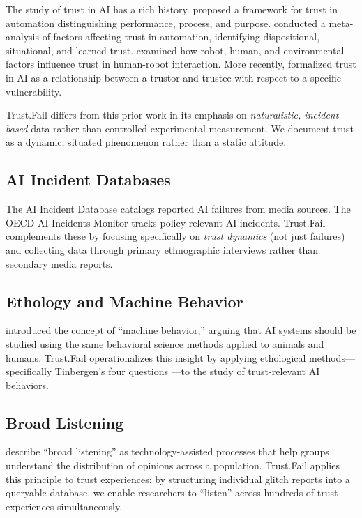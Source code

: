 \documentclass[11pt,a4paper]{article}
\begin{document}
The study of trust in AI has a rich history. \citet{lee2004trust} proposed a framework for trust in automation distinguishing performance, process, and purpose. \citet{hoff2015trust} conducted a meta-analysis of factors affecting trust in automation, identifying dispositional, situational, and learned trust. \citet{hancock2011meta} examined how robot, human, and environmental factors influence trust in human-robot interaction. More recently, \citet{jacovi2021formalizing} formalized trust in AI as a relationship between a trustor and trustee with respect to a specific vulnerability.

Trust.Fail differs from this prior work in its emphasis on \textit{naturalistic, incident-based} data rather than controlled experimental measurement. We document trust as a dynamic, situated phenomenon rather than a static attitude.

\subsection{AI Incident Databases}

The AI Incident Database \citep{mcgregor2021preventing} catalogs reported AI failures from media sources. The OECD AI Incidents Monitor tracks policy-relevant AI incidents. Trust.Fail complements these by focusing specifically on \textit{trust dynamics} (not just failures) and collecting data through primary ethnographic interviews rather than secondary media reports.

\subsection{Ethology and Machine Behavior}

\citet{rahwan2019machine} introduced the concept of ``machine behavior,'' arguing that AI systems should be studied using the same behavioral science methods applied to animals and humans. Trust.Fail operationalizes this insight by applying ethological methods---specifically Tinbergen's four questions \citep{tinbergen1963aims}---to the study of trust-relevant AI behaviors.

\subsection{Broad Listening}

\citet{small2023polis} describe ``broad listening'' as technology-assisted processes that help groups understand the distribution of opinions across a population. Trust.Fail applies this principle to trust experiences: by structuring individual glitch reports into a queryable database, we enable researchers to ``listen'' across hundreds of trust experiences simultaneously.
\end{document}
